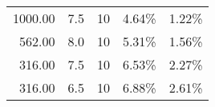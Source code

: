 \documentclass[openany]{article}  %
\begin{document}
\begin{table}
\begin{center}
\begin{tabular}{rrl|ll}
 1000.00 &                      7.5 &                     10 &   4.64\% &   1.22\% \\
  562.00 &                      8.0 &                     10 &   5.31\% &   1.56\% \\
  316.00 &                      7.5 &                     10 &   6.53\% &   2.27\% \\
  316.00 &                      6.5 &                     10 &   6.88\% &   2.61\% \\

\end{tabular}
\end{center}
\end{table}
\end{document}

